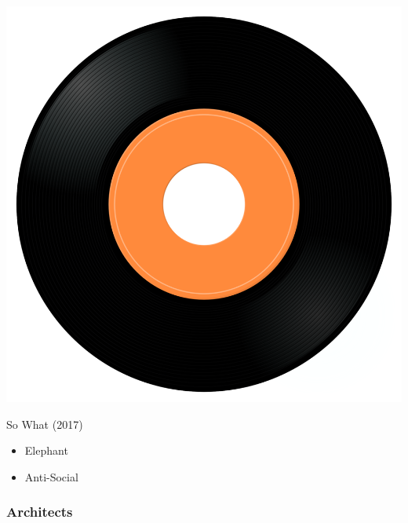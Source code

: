 \begin{minipage}[t]{0.25\textwidth}\vspace{0pt}
\captionsetup{type=figure}
\includegraphics[width=\textwidth]{Images/cover.png}
\caption*{So What (2017)}
\end{minipage}
\begin{minipage}[t]{0.25\textwidth}\vspace{0pt}
\begin{itemize}[nosep,leftmargin=1em,labelwidth=*,align=left]
	\setlength{\itemsep}{0pt}
	\item Elephant
	\item Anti-Social
\end{itemize}
\end{minipage}

\subsubsection{Architects}

